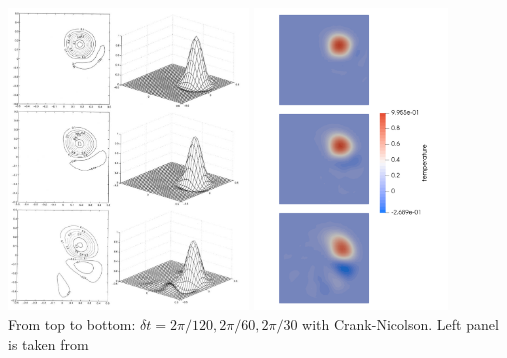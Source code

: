 \begin{center}
\includegraphics[height=8cm]{python_codes/fieldstone_43/images/dohu03}
\includegraphics[height=8cm]{python_codes/fieldstone_43/images/temps_30_60_120}\\
{\small From top to bottom: $\delta t=2\pi/120,2\pi/60,2\pi/30$ with Crank-Nicolson. Left panel is taken from \cite{dohu03}}
\end{center}


